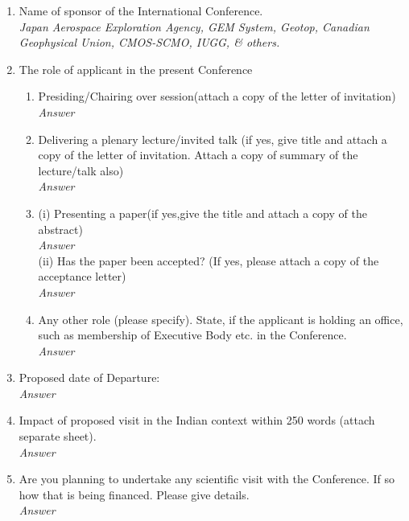 \documentclass[12pt,a4paper]{article}
\begin{document}
\begin{enumerate}
	\item Name of sponsor of the International Conference.\\[1em]
			\textit{Japan Aerospace Exploration Agency, GEM System, 
			        Geotop, Canadian Geophysical Union, CMOS-SCMO, IUGG, \& others.} 
	\item The role of applicant in the present Conference
	\begin{enumerate}
		\item Presiding/Chairing over session(attach a copy of the letter of invitation)\\[1em]
				\textit{Answer}
				
		\item Delivering a plenary lecture/invited talk
			  (if yes, give title and attach a copy of the letter of invitation. 
			  Attach a copy of summary of the lecture/talk also)\\[1em]
				\textit{Answer}

		\item (i) \;Presenting a paper(if yes,give the title and attach a copy of the abstract)\\[1em]
					\textit{Answer}\\
				
 			  (ii)  Has the paper been accepted?   (If yes, please attach a copy of the acceptance letter)\\[1em]
					\textit{Answer}
				
		\item Any other role (please specify).  State, if the applicant is holding an 
			  office, such as membership of Executive Body etc. in the Conference.\\[1em]
			  	\textit{Answer}
	\end{enumerate}
	
	\item Proposed date of Departure:  \\[.5cm]
			\textit{Answer}
	


	\item Impact of proposed visit in the Indian context within 
		  250 words (attach separate sheet).\\[1em]
		  \textit{Answer}
			
			
			
	\item Are you planning to undertake any scientific visit with 
		  the Conference. If so how that is being financed. 
		  Please give details.\\[1em]
		  \textit{Answer}\\
						

\end{enumerate}
\end{document}
